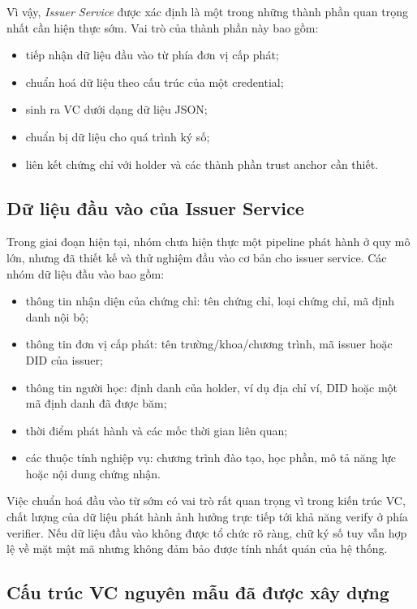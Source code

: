 Vì vậy, \textit{Issuer Service} được xác định là một trong những thành phần quan trọng nhất cần hiện thực sớm. Vai trò của thành phần này bao gồm:
\begin{itemize}
    \item tiếp nhận dữ liệu đầu vào từ phía đơn vị cấp phát;
    \item chuẩn hoá dữ liệu theo cấu trúc của một credential;
    \item sinh ra VC dưới dạng dữ liệu JSON;
    \item chuẩn bị dữ liệu cho quá trình ký số;
    \item liên kết chứng chỉ với holder và các thành phần trust anchor cần thiết.
\end{itemize}

\subsection{Dữ liệu đầu vào của Issuer Service}

Trong giai đoạn hiện tại, nhóm chưa hiện thực một pipeline phát hành ở quy mô lớn, nhưng đã thiết kế và thử nghiệm đầu vào cơ bản cho issuer service. Các nhóm dữ liệu đầu vào bao gồm:
\begin{itemize}
    \item thông tin nhận diện của chứng chỉ: tên chứng chỉ, loại chứng chỉ, mã định danh nội bộ;
    \item thông tin đơn vị cấp phát: tên trường/khoa/chương trình, mã issuer hoặc DID của issuer;
    \item thông tin người học: định danh của holder, ví dụ địa chỉ ví, DID hoặc một mã định danh đã được băm;
    \item thời điểm phát hành và các mốc thời gian liên quan;
    \item các thuộc tính nghiệp vụ: chương trình đào tạo, học phần, mô tả năng lực hoặc nội dung chứng nhận.
\end{itemize}

Việc chuẩn hoá đầu vào từ sớm có vai trò rất quan trọng vì trong kiến trúc VC, chất lượng của dữ liệu phát hành ảnh hưởng trực tiếp tới khả năng verify ở phía verifier. Nếu dữ liệu đầu vào không được tổ chức rõ ràng, chữ ký số tuy vẫn hợp lệ về mặt mật mã nhưng không đảm bảo được tính nhất quán của hệ thống.

\subsection{Cấu trúc VC nguyên mẫu đã được xây dựng}

